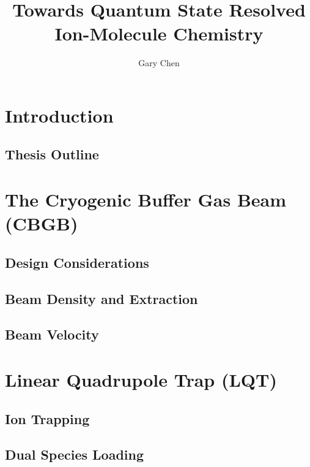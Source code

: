 \documentclass [PhD,nolistoftables,scheader] {uclathes}
\title          {Towards Quantum State Resolved Ion-Molecule Chemistry}
\author         {Gary Chen}
\begin{document}
\makeintropages


\chapter{Introduction}
	
	
	\section{Thesis Outline}
	

\chapter{The Cryogenic Buffer Gas Beam (CBGB)}

	\section{Design Considerations}
	
	
	\section{Beam Density and Extraction}
	
	
	\section{Beam Velocity}
	

\chapter{Linear Quadrupole Trap (LQT)}


	\section{Ion Trapping}
	

	\section{Dual Species Loading}
	
\end{document}
